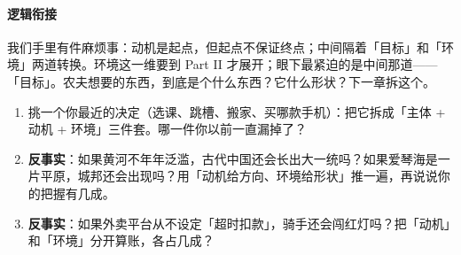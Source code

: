 \documentclass[../../main2.tex]{subfiles}
\begin{document}
\paragraph*{逻辑衔接}
	我们手里有件麻烦事：动机是起点，但起点不保证终点；中间隔着「目标」和「环境」两道转换。环境这一维要到 Part II 才展开；眼下最紧迫的是中间那道——「目标」。农夫想要的东西，到底是个什么东西？它什么形状？下一章拆这个。

\begin{thinkbox}
\begin{enumerate}
	\item 挑一个你最近的决定（选课、跳槽、搬家、买哪款手机）：把它拆成「主体 + 动机 + 环境」三件套。哪一件你以前一直漏掉了？
	\item \textbf{反事实}：如果黄河不年年泛滥，古代中国还会长出大一统吗？如果爱琴海是一片平原，城邦还会出现吗？用「动机给方向、环境给形状」推一遍，再说说你的把握有几成。
	\item \textbf{反事实}：如果外卖平台从不设定「超时扣款」，骑手还会闯红灯吗？把「动机」和「环境」分开算账，各占几成？
\end{enumerate}
\end{thinkbox}
\end{document}
